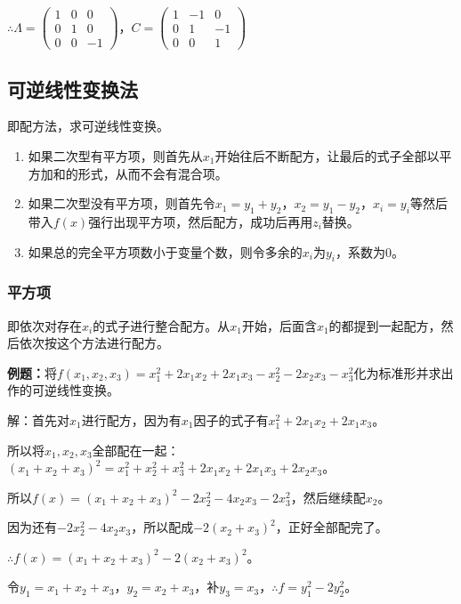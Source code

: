\documentclass[UTF8, 12pt]{ctexart}
\begin{document}
$\therefore\Lambda=\left(\begin{array}{ccc}
    1 & 0 & 0 \\
    0 & 1 & 0 \\
    0 & 0 & -1
\end{array}\right)$，$C=\left(\begin{array}{ccc}
    1 & -1 & 0 \\
    0 & 1 & -1 \\
    0 & 0 & 1
\end{array}\right)$

\subsection{可逆线性变换法}

即配方法，求可逆线性变换。

\begin{enumerate}
    \item 如果二次型有平方项，则首先从$x_1$开始往后不断配方，让最后的式子全部以平方加和的形式，从而不会有混合项。
    \item 如果二次型没有平方项，则首先令$x_1=y_1+y_2$，$x_2=y_1-y_2$，$x_i=y_i$等然后带入$f(x)$强行出现平方项，然后配方，成功后再用$z_i$替换。
    \item 如果总的完全平方项数小于变量个数，则令多余的$x_i$为$y_i$，系数为0。
\end{enumerate}

\subsubsection{平方项}

即依次对存在$x_i$的式子进行整合配方。从$x_1$开始，后面含$x_1$的都提到一起配方，然后依次按这个方法进行配方。

\textbf{例题：}将$f(x_1,x_2,x_3)=x_1^2+2x_1x_2+2x_1x_3-x_2^2-2x_2x_3-x_3^2$化为标准形并求出作的可逆线性变换。

解：首先对$x_1$进行配方，因为有$x_1$因子的式子有$x_1^2+2x_1x_2+2x_1x_3$。

所以将$x_1,x_2,x_3$全部配在一起：$(x_1+x_2+x_3)^2=x_1^2+x_2^2+x_3^2+2x_1x_2+2x_1x_3+2x_2x_3$。

所以$f(x)=(x_1+x_2+x_3)^2-2x_2^2-4x_2x_3-2x_3^2$，然后继续配$x_2$。

因为还有$-2x_2^2-4x_2x_3$，所以配成$-2(x_2+x_3)^2$，正好全部配完了。

$\therefore f(x)=(x_1+x_2+x_3)^2-2(x_2+x_3)^2$。

令$y_1=x_1+x_2+x_3$，$y_2=x_2+x_3$，补$y_3=x_3$，$\therefore f=y_1^2-2y_2^2$。
\end{document}
